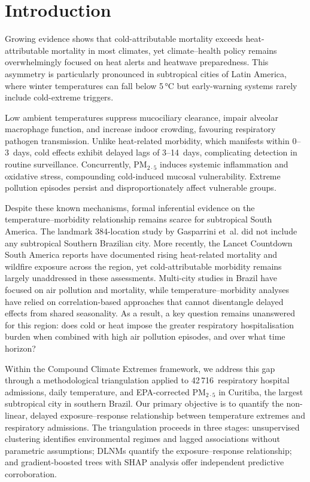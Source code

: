 \documentclass[review,number]{elsarticle}
\begin{document}
\section{Introduction}

Growing evidence shows that cold-attributable mortality
exceeds heat-attributable mortality in most
climates,\cite{Gasparrini2015} yet climate--health policy remains
overwhelmingly focused on heat alerts and heatwave preparedness.
This asymmetry is particularly pronounced in subtropical cities of
Latin America, where winter temperatures can fall below
5\,°C but early-warning systems rarely include cold-extreme
triggers.\cite{Bell2024,McMichael2006}

Low ambient temperatures suppress mucociliary clearance, impair
alveolar macrophage function, and increase indoor crowding, favouring
respiratory pathogen transmission.\cite{Linares2025} Unlike
heat-related morbidity, which manifests within 0--3~days, cold effects
exhibit delayed lags of 3--14~days, complicating detection in routine
surveillance.\cite{Ebi2021,Cheng2024} Concurrently,
$\text{PM}_{2{\cdot}5}$ induces systemic inflammation and oxidative stress,
compounding cold-induced mucosal vulnerability.\cite{Cheng2024}
Extreme pollution episodes persist and disproportionately affect
vulnerable groups.\cite{Requia2024}

Despite these known mechanisms, formal inferential evidence on the
temperature--morbidity relationship remains scarce for subtropical
South America. The landmark 384-location study by Gasparrini
et~al.\cite{Gasparrini2015} did not include any subtropical Southern
Brazilian city. More recently, the Lancet Countdown South America
reports have documented rising heat-related mortality and wildfire
exposure across the region,\cite{LancetCountdownSA2025} yet
cold-attributable morbidity remains largely unaddressed in these
assessments. Multi-city studies in Brazil have focused on air
pollution and mortality,\cite{Requia2024} while temperature--morbidity
analyses have relied on correlation-based approaches that cannot
disentangle delayed effects from shared seasonality. As a result,
a key question remains unanswered for this region: does cold
or heat impose the greater respiratory hospitalisation burden when
combined with high air pollution episodes, and over what time horizon?

Within the Compound Climate Extremes
framework,\cite{Zscheischler2020} we address this gap through a
methodological triangulation applied to 42\,716~respiratory hospital
admissions, daily temperature, and EPA-corrected $\text{PM}_{2{\cdot}5}$ in
Curitiba, the largest subtropical city in southern Brazil. Our primary
objective is to quantify the non-linear, delayed exposure--response
relationship between temperature extremes and respiratory admissions.
The triangulation proceeds in three stages: unsupervised clustering
identifies environmental regimes and lagged associations without
parametric assumptions; DLNMs quantify the exposure--response relationship; and gradient-boosted trees with SHAP analysis offer
independent predictive corroboration.
\end{document}
